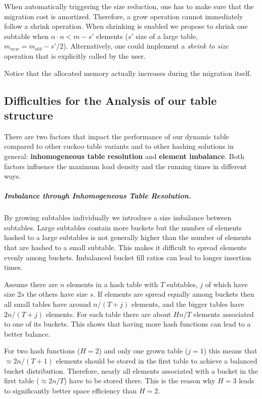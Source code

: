 \documentclass[a4paper,UKenglish]{lipics-v2016}
\begin{document}
When automatically triggering the size reduction, one has to make sure
that the migration cost is amortized. Therefore, a grow operation cannot
immediately follow a shrink operation.  When shrinking is enabled we
propose to shrink one subtable when $\alpha\cdot n < m-s'$ elements
($s'$ size of a large table, $m_{new} = m_{old} -s'/2$).
Alternatively, one could implement a \emph{shrink to size} operation that is
explicitly called by the user.

Notice that the allocated memory actually increases during the
migration itself.

\subsection{Difficulties for the Analysis of our table structure}
There are two factors that impact the performance of our dynamic
table compared to other cuckoo table variants and to other hashing
solutions in general: \textbf{inhomogeneous table resolution} and
\textbf{element imbalance}.
Both factors influence the maximum load density and the
running times in different ways.

\subparagraph*{Imbalance through Inhomogeneous Table Resolution.}
\label{sec:inhom_res}
By growing subtables individually we introduce a size imbalance
between subtables. Large subtables contain more buckets but the number
of elements hashed to a large subtables is not generally higher than
the number of elements that are hashed to a small subtable.  This
makes it difficult to spread elements evenly among buckets.
Imbalanced bucket fill ratios can lead to longer insertion times.

Assume there are $n$ elements in a hash table with $T$ subtables,
$j$ of which have size $2s$ the others have size $s$. If elements are
spread equally among buckets then all small tables have around
$n/(T+j)$ elements, and the bigger tables have $2n/(T+j)$ elements.
For each table there are about $Hn/T$ elements associated to one of
its buckets.  This shows that having more hash functions can lead to a
better balance.

For two hash functions ($H=2$) and only one grown table ($j=1$) this
means that $\approx 2n/(T+1)$ elements should be stored in the first table to
achieve a balanced bucket distribution.  Therefore, nearly all
elements associated with a bucket in the first table ($\approx 2n/T$)
have to be stored there.  This is the reason why $H=3$ leads to
significantly better space efficiency than $H=2$.
\end{document}
